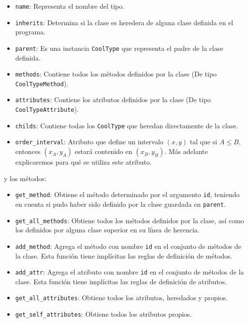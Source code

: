 \documentclass[a4paper,10pt,twocolumn]{article}
\begin{document}
\begin{itemize}
	\item \lstinline|name|: Representa el nombre del tipo. 
	\item \lstinline|inherits|: Determina si la clase es heredera de alguna clase definida en el programa. 
	\item \lstinline|parent|: Es una instancia \lstinline|CoolType| que representa el padre de la clase definida. 
	\item \lstinline|methods|: Contiene todos los métodos definidos por la clase (De tipo \lstinline|CoolTypeMethod|). 
	\item \lstinline|attributes|: Contiene los atributos definidos por la clase (De tipo \lstinline|CoolTypeAttribute|).
	\item \lstinline|childs|: Contiene todas los \lstinline|CoolType| que heredan directamente de la clase. 
	\item \lstinline|order_interval|: Atributo que define un intervalo $(x, y)$ tal que si $A\leq B$, entonces $(x_A, y_A)$ estará contenido en $(x_B, y_B)$. Más adelante explicaremos para qué se utiliza este atributo. 
\end{itemize}

y los métodos: 

\begin{itemize}
	\item \lstinline|get_method|: Obtiene el método determinado por el argumento \lstinline|id|, teniendo en cuenta si pudo haber sido definido por la clase guardada en \lstinline|parent|. 
	\item \lstinline|get_all_methods|: Obtiene todos los métodos definidos por la clase, así como los definidos por alguna clase superior en su línea de herencia. 
	\item \lstinline|add_method|: Agrega el método con nombre \lstinline|id| en el conjunto de métodos de la clase. Esta función tiene implícitas las reglas de definición de métodos. 
	\item \lstinline|add_attr|: Agrega el atributo con nombre \lstinline|id| en el conjunto de métodos de la clase. Esta función tiene implícitas las reglas de definición de atributos. 
	\item \lstinline|get_all_attributes|: Obtiene todos los atributos, heredados y propios. 
	\item \lstinline|get_self_attributes|: Obtiene todos los atributos propios. 
	
\end{itemize}
\end{document}
